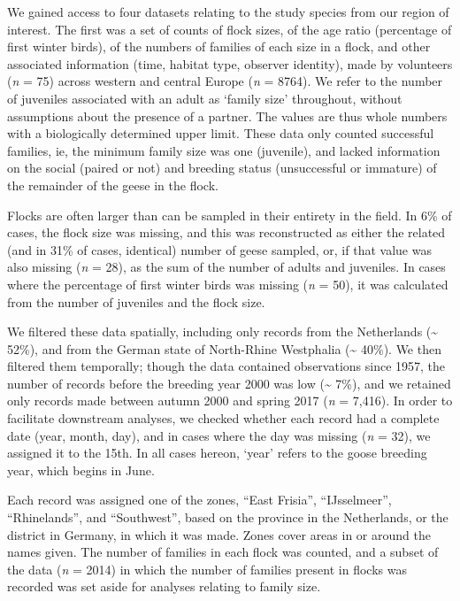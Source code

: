 \documentclass[twocolumn]{article}
\begin{document}
We gained access to four datasets relating to the study species from our
region of interest. The first was a set of counts of flock sizes, of the
age ratio (percentage of first winter birds), of the numbers of families
of each size in a flock, and other associated information (time, habitat
type, observer identity), made by volunteers (\emph{n} = 75) across
western and central Europe (\emph{n} = 8764). We refer to the number of
juveniles associated with an adult as `family size' throughout, without
assumptions about the presence of a partner. The values are thus whole
numbers with a biologically determined upper limit. These data only
counted successful families, ie, the minimum family size was one
(juvenile), and lacked information on the social (paired or not) and
breeding status (unsuccessful or immature) of the remainder of the geese
in the flock.

Flocks are often larger than can be sampled in their entirety in the
field. In 6\% of cases, the flock size was missing, and this was
reconstructed as either the related (and in 31\% of cases, identical)
number of geese sampled, or, if that value was also missing (\emph{n} =
28), as the sum of the number of adults and juveniles. In cases where
the percentage of first winter birds was missing (\emph{n} = 50), it was
calculated from the number of juveniles and the flock size.

We filtered these data spatially, including only records from the
Netherlands (\textasciitilde{} 52\%), and from the German state of
North-Rhine Westphalia (\textasciitilde{} 40\%). We then filtered them
temporally; though the data contained observations since 1957, the
number of records before the breeding year 2000 was low
(\textasciitilde{} 7\%), and we retained only records made between
autumn 2000 and spring 2017 (\emph{n} = 7,416). In order to facilitate
downstream analyses, we checked whether each record had a complete date
(year, month, day), and in cases where the day was missing (\emph{n} =
32), we assigned it to the 15th. In all cases hereon, `year' refers to
the goose breeding year, which begins in June.

Each record was assigned one of the zones, ``East Frisia'',
``IJsselmeer'', ``Rhinelands'', and ``Southwest'', based on the province
in the Netherlands, or the district in Germany, in which it was made.
Zones cover areas in or around the names given. The number of families
in each flock was counted, and a subset of the data (\emph{n} = 2014) in
which the number of families present in flocks was recorded was set
aside for analyses relating to family size.
\end{document}
